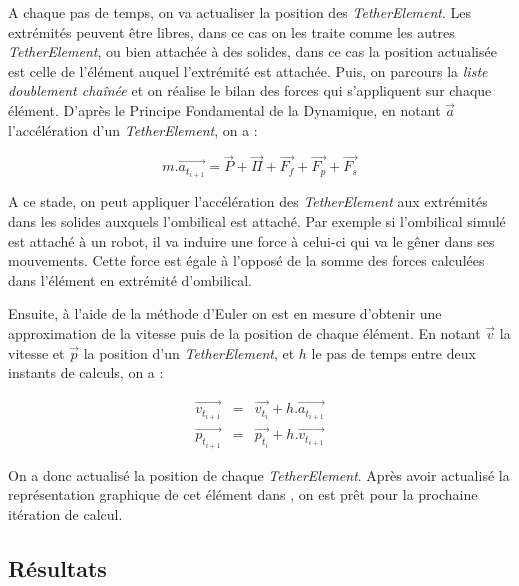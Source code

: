				A chaque pas de temps, on va actualiser la position des \textit{TetherElement}. Les extrémités peuvent être libres, dans ce cas on les traite comme les autres \textit{TetherElement}, ou bien attachée à des solides, dans ce cas la position actualisée est celle de l'élément auquel l'extrémité est attachée. Puis, on parcours la \textit{liste doublement chaînée} et on réalise le bilan des forces qui s'appliquent sur chaque élément. D'après le Principe Fondamental de la Dynamique, en notant $\overrightarrow{a}$ l'accélération d'un \textit{TetherElement}, on a :

				\begin{equation}
					m.\overrightarrow{a_{t_{i+1}}} = \overrightarrow{P} + \overrightarrow{\Pi} + \overrightarrow{F_f} + \overrightarrow{F_p} + \overrightarrow{F_s}
					\label{eq:newton}
				\end{equation}

				A ce stade, on peut appliquer l'accélération des \textit{TetherElement} aux extrémités dans les solides auxquels l'ombilical est attaché. Par exemple si l'ombilical simulé est attaché à un robot, il va induire une force à celui-ci qui va le gêner dans ses mouvements. Cette force est égale à l'opposé de la somme des forces calculées dans l'élément en extrémité d'ombilical.
				
				Ensuite, à l'aide de la méthode d'Euler on est en mesure d'obtenir une approximation de la vitesse puis de la position de chaque élément. En notant $\overrightarrow{v}$ la vitesse et $\overrightarrow{p}$ la position d'un \textit{TetherElement}, et $h$ le pas de temps entre deux instants de calculs, on a :

				\begin{eqnarray}
					\overrightarrow{v_{t_{i+1}}} & = & \overrightarrow{v_{t_i}} + h.\overrightarrow{a_{t_{i+1}}} \\
					\overrightarrow{p_{t_{i+1}}} & = & \overrightarrow{p_{t_i}} + h.\overrightarrow{v_{t_{i+1}}}
					\label{eq:euler}
				\end{eqnarray}

				On a donc actualisé la position de chaque \textit{TetherElement}. Après avoir actualisé la représentation graphique de cet élément dans \gazebo{}, on est prêt pour la prochaine itération de calcul.
			
		\subsection{Résultats}
			
